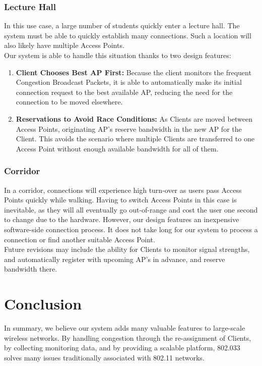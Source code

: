 \documentclass[11pt,twocolumn]{article}
\begin{document}
\subsubsection{Lecture Hall}
\indent In this use case, a large number of students quickly enter a lecture hall. The system must be able to quickly establish many connections. Such a location
will also likely have multiple Access Points. \\
\indent Our system is able to handle this situation thanks to two design features:
\begin{enumerate}
	\item \textbf{Client Chooses Best AP First:} Because the client monitors the frequent Congestion Broadcast Packets, it is able to automatically make its
	initial connection request to the best available AP, reducing the need for the connection to be moved elsewhere.
	\item \textbf{Reservations to Avoid Race Conditions:} As Clients are moved between Access Points, originating AP's reserve bandwidth in the new AP for the
	Client. This avoids the scenario where multiple Clients are transferred to one Access Point without enough available bandwidth for all of them.
\end{enumerate}
\subsubsection{Corridor}
\indent In a corridor, connections will experience high turn-over as users pass Access Points quickly while walking. Having to switch Access Points in this case
is inevitable, as they will all eventually go out-of-range and cost the user one second to change due to the hardware. However, our design features an 
inexpensive software-side connection process. It does not take long for our system to process a connection or find another suitable Access Point.\\
\indent Future revisions may include the ability for Clients to monitor signal strengths, and automatically register with upcoming AP's in advance, and reserve bandwidth there.

\section{Conclusion}
\indent In summary, we believe our system adds many valuable features to large-scale wireless networks. By handling congestion through the re-assignment of Clients, by collecting monitoring data, and by providing a scalable platform, 802.033 solves many issues traditionally associated with 802.11 networks. 
\end{document}
